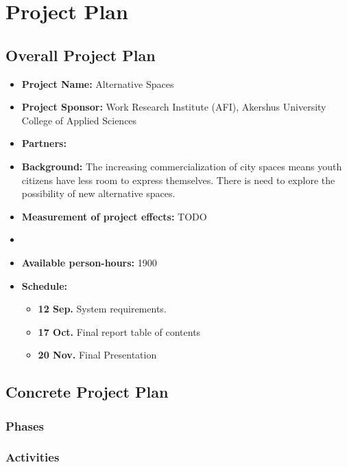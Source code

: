 \chapter{Project Plan}

\section{Overall Project Plan}
\begin{itemize}
\item \textbf{Project Name:} Alternative Spaces
\item \textbf{Project Sponsor:} Work Research Institute (AFI), Akershus University College of Applied Sciences
\item \textbf{Partners:}
\item \textbf{Background:} The increasing commercialization of city spaces means youth citizens have less room to express themselves. There is need to explore the possibility of new alternative spaces.
\item \textbf{Measurement of project effects:} TODO
\item 
\item \textbf{Available person-hours:} 1900
\item \textbf{Schedule: } 
  \begin{itemize}
  \item \textbf{12 Sep.} System requirements. 
  \item \textbf{17 Oct.} Final report table of contents
  \item \textbf{20 Nov.} Final Presentation
  \end{itemize}
\end{itemize}


\section{Concrete Project Plan}
\subsection{Phases}
\subsection{Activities}
